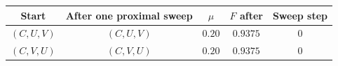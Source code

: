 \begin{tabular}{ccccc}
\toprule
Start & After one proximal sweep & $\mu$ & $F$ after & Sweep step \\
\midrule
$(C,U,V)$ & $(C,U,V)$ & $0.20$ & $0.9375$ & $0$ \\
$(C,V,U)$ & $(C,V,U)$ & $0.20$ & $0.9375$ & $0$ \\
\bottomrule
\end{tabular}
